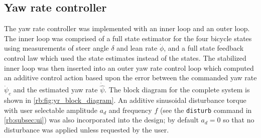 \subsection{Yaw rate controller} \label{rb:subsec:yr_control}
The yaw rate controller was implemented with an inner loop and an outer loop.
The inner loop was comprised of a full state estimator for the four bicycle
states using measurements of steer angle $\delta$ and lean rate $\dot{\phi}$,
and a full state feedback control law which used the state estimates instead of
the states. The stabilized inner loop was then inserted into an outer yaw rate
control loop which computed an additive control action based upon the error
between the commanded yaw rate $\dot{\psi}_c$ and the estimated yaw rate
$\dot{\hat{\psi}}$.  The block diagram for the complete system is shown in
\autoref{rb:fig:yr_block_diagram}. An additive sinusoidal disturbance torque
with user selectable amplitude $a_d$ and frequency $f$ (see the \verb|disturb|
command in \autoref{rb:subsec:ui}) was also incorporated into the design; by
default $a_d=0$ so that no disturbance was applied unless requested by the
user.

